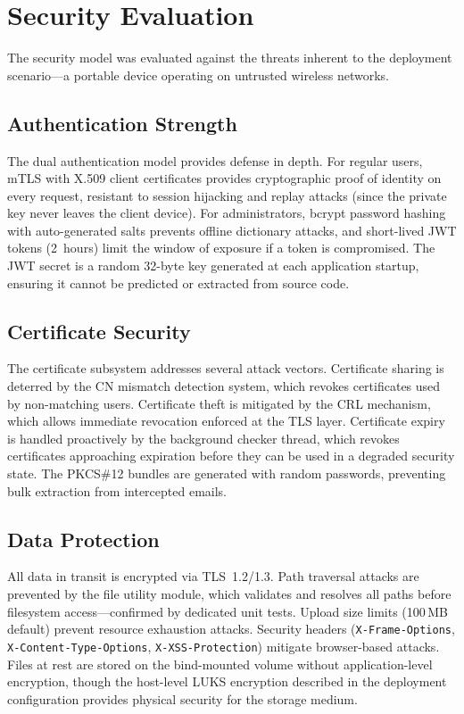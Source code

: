 \documentclass[12pt,letterpaper]{report}
\begin{document}
\section{Security Evaluation}

The security model was evaluated against the threats inherent to the deployment scenario---a portable device operating on untrusted wireless networks.

\subsection{Authentication Strength}

The dual authentication model provides defense in depth. For regular users, mTLS with X.509 client certificates provides cryptographic proof of identity on every request, resistant to session hijacking and replay attacks (since the private key never leaves the client device). For administrators, bcrypt password hashing with auto-generated salts prevents offline dictionary attacks, and short-lived JWT tokens (2~hours) limit the window of exposure if a token is compromised. The JWT secret is a random 32-byte key generated at each application startup, ensuring it cannot be predicted or extracted from source code.

\subsection{Certificate Security}

The certificate subsystem addresses several attack vectors. Certificate sharing is deterred by the CN mismatch detection system, which revokes certificates used by non-matching users. Certificate theft is mitigated by the CRL mechanism, which allows immediate revocation enforced at the TLS layer. Certificate expiry is handled proactively by the background checker thread, which revokes certificates approaching expiration before they can be used in a degraded security state. The PKCS\#12 bundles are generated with random passwords, preventing bulk extraction from intercepted emails.

\subsection{Data Protection}

All data in transit is encrypted via TLS~1.2/1.3. Path traversal attacks are prevented by the file utility module, which validates and resolves all paths before filesystem access---confirmed by dedicated unit tests. Upload size limits (100\,MB default) prevent resource exhaustion attacks. Security headers (\texttt{X-Frame-Options}, \texttt{X-Content-Type-Options}, \texttt{X-XSS-Protection}) mitigate browser-based attacks. Files at rest are stored on the bind-mounted volume without application-level encryption, though the host-level LUKS encryption described in the deployment configuration provides physical security for the storage medium.
\end{document}
